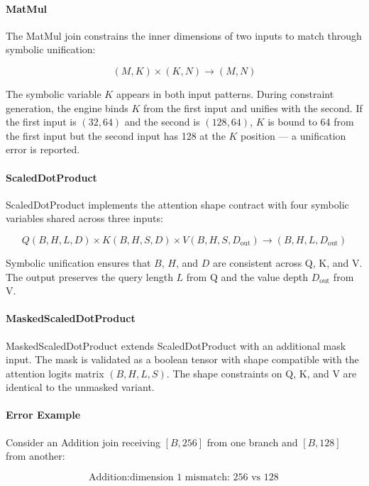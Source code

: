 \documentclass[11pt,a4paper]{article}
\begin{document}
\paragraph{MatMul}

The MatMul join constrains the inner dimensions of two inputs to match through symbolic unification:

\[
(M, K) \times (K, N) \rightarrow (M, N)
\]

The symbolic variable $K$ appears in both input patterns. During constraint generation, the engine binds $K$ from the first input and unifies with the second. If the first input is $(32, 64)$ and the second is $(128, 64)$, $K$ is bound to 64 from the first input but the second input has 128 at the $K$ position --- a unification error is reported.

\paragraph{ScaledDotProduct}

ScaledDotProduct implements the attention shape contract with four symbolic variables shared across three inputs:

\[
Q(B, H, L, D) \times K(B, H, S, D) \times V(B, H, S, D_{\text{out}}) \rightarrow (B, H, L, D_{\text{out}})
\]

Symbolic unification ensures that $B$, $H$, and $D$ are consistent across Q, K, and V. The output preserves the query length $L$ from Q and the value depth $D_{\text{out}}$ from V.

\paragraph{MaskedScaledDotProduct}

MaskedScaledDotProduct extends ScaledDotProduct with an additional mask input. The mask is validated as a boolean tensor with shape compatible with the attention logits matrix $(B, H, L, S)$. The shape constraints on Q, K, and V are identical to the unmasked variant.

\paragraph{Error Example}

Consider an Addition join receiving $[B, 256]$ from one branch and $[B, 128]$ from another:

\[
\text{Addition}: \text{dimension 1 mismatch: 256 vs 128}
\]
\end{document}
